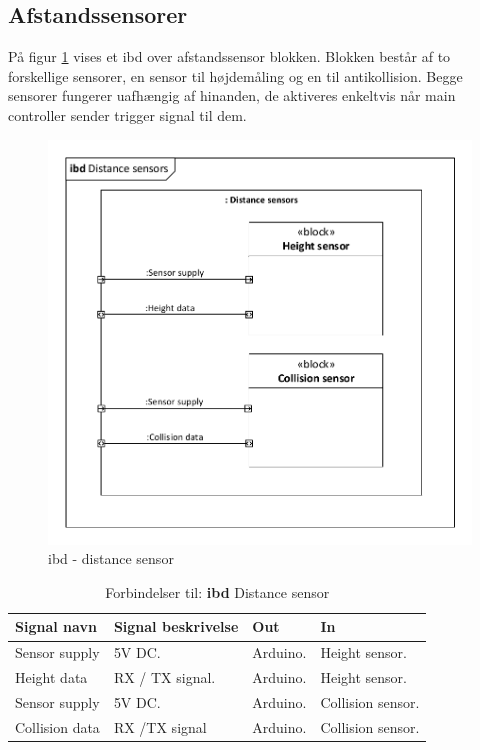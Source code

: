 \subsection{Afstandssensorer}

På figur \ref{fig:ibd_distancesensor} vises et ibd over afstandssensor blokken. 
Blokken består af to forskellige sensorer, en sensor til højdemåling og en til antikollision. Begge sensorer fungerer uafhængig af hinanden, de aktiveres enkeltvis når main controller sender trigger signal til dem.   

\begin{figure}[H]
\centering
\includegraphics[width=1\textwidth]{Billeder/IBD/ibd4_distancesensor.pdf}
\vspace{-1cm}
\caption{ibd - distance sensor}
\label{fig:ibd_distancesensor}
\end{figure}

\begin{table}[H]
	\centering
		\begin{tabular}{|p{2.6 cm}|p{4.9 cm}|p{2.5 cm}|p{2.5 cm}|} 
		\hline
			\textbf{Signal navn} 	& \textbf{Signal beskrivelse}		& \textbf{Out} 				& \textbf{In}     \\ \hline
			Sensor supply & 5V DC.  & Arduino. & Height sensor.  \\ \hline
			Height data & RX / TX signal. & Arduino.	& Height sensor.	\\ \hline
			Sensor supply & 5V DC. & Arduino. & Collision sensor.	\\ \hline
			Collision data & RX /TX signal & Arduino. & Collision sensor.			    \\ \hline  
		\end{tabular}
	\caption{Forbindelser til: \textbf{ibd} Distance sensor}
	\label{tab:IBDDistancesensor}
\end{table}
